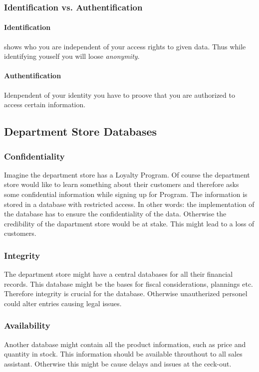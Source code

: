 \documentclass[12pt]{article}
\begin{document}
\subsubsection{Identification vs. Authentification}

\paragraph{Identification} %
\label{par:Identification}
shows who you are independent of your access rights to given data. Thus while identifying youself you will loose \emph{anonymity}.

\paragraph{Authentification} %
\label{par:Authentification}
Idenpendent of your identity you have to proove that you are authorized to access certain information.

\subsection{Department Store Databases}

\subsubsection{Confidentiality}
Imagine the department store has a Loyalty Program. Of course the department store would like to learn something about their customers and therefore asks some confidential information while signing up for Program. The information is stored in a database with restricted access. In other words: the implementation of the database has to ensure the confidentiality of the data. Otherwise the credibility of the dapartment store would be at stake. This might lead to a loss of customers. 

\subsubsection{Integrity}
The department store might have a central databases for all their financial records. This database might be the bases for fiscal considerations, plannings etc. Therefore integrity is crucial for the database. Otherwise unautherized personel could alter entries causing legal issues.

\subsubsection{Availability}
Another database might contain all the product information, such as price and quantity in stock. This information should be available throuthout to all sales assistant. Otherwise this might be cause delays and issues at the ceck-out.
\end{document}

